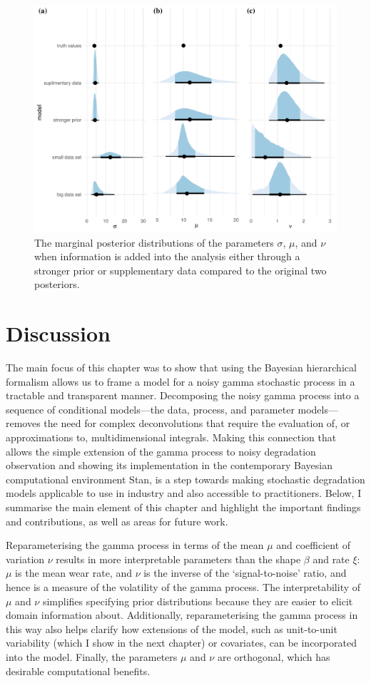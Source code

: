 \begin{figure}
  \centering
  \includegraphics[width=0.8\columnwidth]{./figures/ch-4/marginal-post-extra-info.pdf}
  \caption{The marginal posterior distributions of the parameters $\sigma$, $\mu$, and $\nu$ when information is added into the analysis either through a stronger prior or supplementary data compared to the original two posteriors.}
  \label{fig:marginal-post-extra-info}
\end{figure}

\section{Discussion} \label{sec:NGP-discussion}

The main focus of this chapter was to show that using the Bayesian hierarchical formalism allows us to frame a model for a noisy gamma stochastic process in a tractable and transparent manner. Decomposing the noisy gamma process into a sequence of conditional models---the data, process, and parameter models---removes the need for complex deconvolutions that require the evaluation of, or approximations to, multidimensional integrals. Making this connection that allows the simple extension of the gamma process to noisy degradation observation and showing its implementation in the contemporary Bayesian computational environment Stan, is a step towards making stochastic degradation models applicable to use in industry and also accessible to practitioners. Below, I summarise the main element of this chapter and highlight the important findings and contributions, as well as areas for future work.

Reparameterising the gamma process in terms of the mean $\mu$ and coefficient of variation $\nu$ results in more interpretable parameters than the shape $\beta$ and rate $\xi$: $\mu$ is the mean wear rate, and $\nu$ is the inverse of the `signal-to-noise' ratio, and hence is a measure of the volatility of the gamma process. The interpretability of $\mu$ and $\nu$ simplifies specifying prior distributions because they are easier to elicit domain information about. Additionally, reparameterising the gamma process in this way also helps clarify how extensions of the model, such as unit-to-unit variability (which I show in the next chapter) or covariates, can be incorporated into the model. Finally, the parameters $\mu$ and $\nu$ are orthogonal, which has desirable computational benefits.

